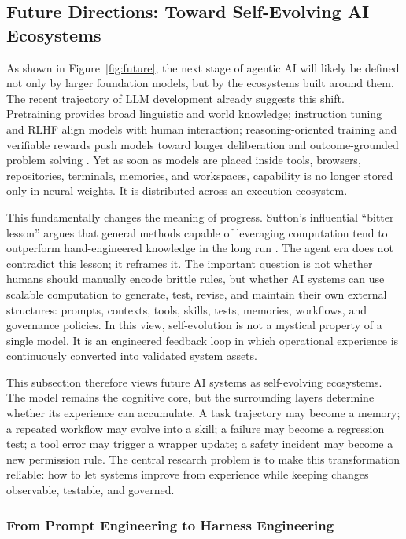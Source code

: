 \subsection{Future Directions: Toward Self-Evolving AI Ecosystems}

As shown in Figure~\ref{fig:future}, the next stage of agentic AI will likely be defined not only by larger foundation models, but by the ecosystems built around them. The recent trajectory of LLM development already suggests this shift. Pretraining provides broad linguistic and world knowledge; instruction tuning and RLHF align models with human interaction; reasoning-oriented training and verifiable rewards push models toward longer deliberation and outcome-grounded problem solving \citep{openai2024o1,deepseek2025r1}. Yet as soon as models are placed inside tools, browsers, repositories, terminals, memories, and workspaces, capability is no longer stored only in neural weights. It is distributed across an execution ecosystem.

This fundamentally changes the meaning of progress. Sutton's influential ``bitter lesson'' argues that general methods capable of leveraging computation tend to outperform hand-engineered knowledge in the long run \citep{sutton2019bitterlesson}. The agent era does not contradict this lesson; it reframes it. The important question is not whether humans should manually encode brittle rules, but whether AI systems can use scalable computation to generate, test, revise, and maintain their own external structures: prompts, contexts, tools, skills, tests, memories, workflows, and governance policies. In this view, self-evolution is not a mystical property of a single model. It is an engineered feedback loop in which operational experience is continuously converted into validated system assets.

This subsection therefore views future AI systems as self-evolving ecosystems. The model remains the cognitive core, but the surrounding layers determine whether its experience can accumulate. A task trajectory may become a memory; a repeated workflow may evolve into a skill; a failure may become a regression test; a tool error may trigger a wrapper update; a safety incident may become a new permission rule. The central research problem is to make this transformation reliable: how to let systems improve from experience while keeping changes observable, testable, and governed.

\subsubsection{From Prompt Engineering to Harness Engineering}


